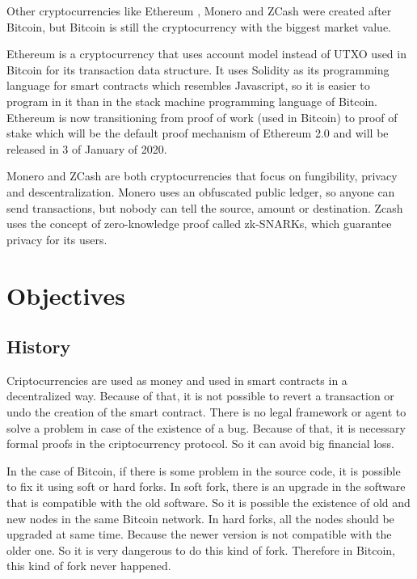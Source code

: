 \documentclass[12pt]{article}
\begin{document}
Other cryptocurrencies like Ethereum \cite{wood2014ethereum}, Monero \cite{noether2015ring} and
ZCash \cite{hopwood2016zcash} were created after Bitcoin,
but Bitcoin is still the cryptocurrency with the biggest market value.

Ethereum is a cryptocurrency that uses account model instead of UTXO used in Bitcoin for its
transaction data structure.
It uses Solidity as its programming language for smart contracts which resembles Javascript,
so it is easier to program in it than in the stack machine programming language of Bitcoin.
Ethereum is now transitioning from proof of work (used in Bitcoin) to proof of stake
which will be the default proof mechanism of Ethereum 2.0 and will be released in
3 of January of 2020.

Monero and ZCash are both cryptocurrencies that focus on fungibility, privacy and descentralization.
Monero uses an obfuscated public ledger, so anyone can send transactions,
but nobody can tell the source, amount or destination.
Zcash uses the concept of zero-knowledge proof called zk-SNARKs, which guarantee privacy for its users.

\section{Objectives}

\subsection{History}

Criptocurrencies are used as money and used in smart contracts in a decentralized way.
Because of that, it is not possible to revert a transaction or undo the creation of the smart contract.
There is no legal framework or agent to solve a problem in case of the existence of a bug.
Because of that, it is necessary formal proofs in the criptocurrency protocol.
So it can avoid big financial loss.

In the case of Bitcoin, if there is some problem in the source code,
it is possible to fix it using soft or hard forks.
In soft fork, there is an upgrade in the software that is compatible with the old software.
So it is possible the existence of old and new nodes in the same Bitcoin network.
In hard forks, all the nodes should be upgraded at same time.
Because the newer version is not compatible with the older one.
So it is very dangerous to do this kind of fork.
Therefore in Bitcoin, this kind of fork never happened.
\end{document}
